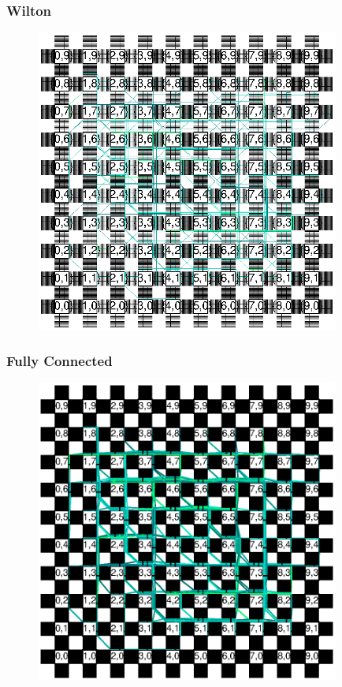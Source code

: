 \documentclass[11pt]{article}
\begin{document}
\subsubsection{Wilton}
\begin{figure}[H]
\centering
\includegraphics[clip, viewport=195 270 446 520, width=10cm]{assets/wilton-cct3-as-is}
\end{figure}

\subsubsection{Fully Connected}
\begin{figure}[H]
\centering
\includegraphics[clip, viewport=155 245 457 547, width=10cm]{assets/fc-cct3-as-is}
\end{figure}
\end{document}
